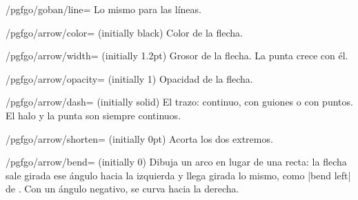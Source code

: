 \begin{key}{/pgfgo/goban/line=}
	Lo mismo para las líneas.
\end{key}

\begin{key}{/pgfgo/arrow/color= (initially black)}
	Color de la flecha.
\end{key}

\begin{key}{/pgfgo/arrow/width= (initially 1.2pt)}
	Grosor de la flecha. La punta crece con él.
\end{key}

\begin{key}{/pgfgo/arrow/opacity= (initially 1)}
	Opacidad de la flecha.

	\begin{codeexample}[]
		\begin{goban}[5]
		\end{goban}
	\end{codeexample}
\end{key}

\begin{key}{/pgfgo/arrow/dash= (initially solid)}
	El trazo: continuo, con guiones o con puntos. El halo y la punta son siempre continuos.
\end{key}

\begin{key}{/pgfgo/arrow/shorten= (initially 0pt)}
	Acorta los dos extremos.

	\begin{codeexample}[]
		\begin{goban}[5]
		\end{goban}
	\end{codeexample}
\end{key}

\begin{key}{/pgfgo/arrow/bend= (initially 0)}
	Dibuja un arco en lugar de una recta: la flecha sale girada ese ángulo hacia la izquierda y llega girada lo mismo, como |bend left| de \tikzname. Con un ángulo negativo, se curva hacia la derecha.

	\begin{codeexample}[]
		\begin{goban}[5]
		\end{goban}
	\end{codeexample}
\end{key}

